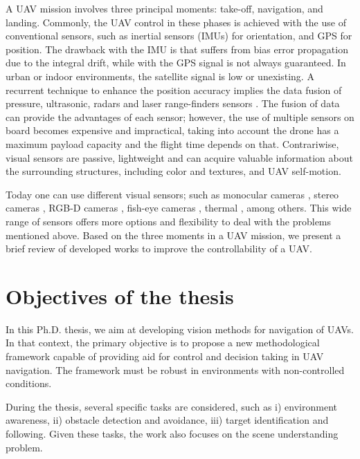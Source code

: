 A UAV mission involves three principal moments: take-off, navigation, and landing. Commonly, the UAV  control in these phases is achieved with the use of conventional sensors, such as inertial sensors (IMUs) for orientation, and GPS for position. The drawback with the IMU is that suffers from bias error propagation due to the integral drift, while with the GPS signal is not always guaranteed. In urban or indoor environments, the satellite signal is low or unexisting. A recurrent technique to enhance the position accuracy implies the data fusion of pressure, ultrasonic, radars and laser range-finders sensors \cite{Tomic.Schmid.ea:IRAM:2012}. The fusion of data can provide the advantages of each sensor; however, the use of multiple sensors on board becomes expensive and impractical, taking into account the drone has a maximum payload capacity and the flight time depends on that. Contrariwise, visual sensors are passive, lightweight and can acquire valuable information about the surrounding structures, including color and textures, and UAV self-motion. 

Today one can use different visual sensors; such as monocular cameras \cite{Padhy.Xia.ea:TSC:2018}, stereo cameras \cite{Seitz.Curless.ea:CVPR:2006}, RGB-D cameras \cite{Huang.Bachrach.ea:RobR:2017}, fish-eye cameras \cite{Hrabar.Sukhatme:IROS:2004}, thermal \cite{Gaszczak.Breckon.ea:IRCV:2011}, among others. This wide range of sensors offers more options and flexibility to deal with the problems mentioned above. Based on the three moments in a UAV mission, we present a brief review of developed works to improve the controllability of a UAV. 


 
\section{Objectives of the thesis}\label{sec:thesis_objectives}

In this Ph.D. thesis, we aim at developing vision methods for navigation of UAVs. In that context, the primary objective is to propose a new methodological framework capable of providing aid for control and decision taking in UAV navigation. The framework must be robust in environments with non-controlled conditions. 

During the thesis, several specific tasks are considered, such as i) environment awareness, ii) obstacle detection and avoidance, iii) target identification and following. Given these tasks, the work also focuses on the scene understanding problem. 

